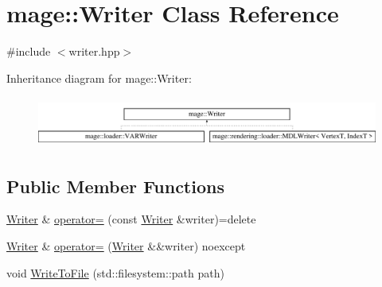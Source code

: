 \hypertarget{classmage_1_1_writer}{}\section{mage\+:\+:Writer Class Reference}
\label{classmage_1_1_writer}


{\ttfamily \#include $<$writer.\+hpp$>$}

Inheritance diagram for mage\+:\+:Writer\+:\begin{figure}[H]
\begin{center}
\leavevmode
\includegraphics[height=1.676647cm]{classmage_1_1_writer}
\end{center}
\end{figure}
\subsection*{Public Member Functions}
\begin{DoxyCompactItemize}
\item 
\mbox{\hyperlink{classmage_1_1_writer}{Writer}} \& \mbox{\hyperlink{classmage_1_1_writer_a81ea888d1b170515713432ca28629ceb}{operator=}} (const \mbox{\hyperlink{classmage_1_1_writer}{Writer}} \&writer)=delete
\item 
\mbox{\hyperlink{classmage_1_1_writer}{Writer}} \& \mbox{\hyperlink{classmage_1_1_writer_a03a93796179f22be90471bea0f7a7cf0}{operator=}} (\mbox{\hyperlink{classmage_1_1_writer}{Writer}} \&\&writer) noexcept
\item 
void \mbox{\hyperlink{classmage_1_1_writer_ac01e930b55888da88e345b0910d4b1c2}{Write\+To\+File}} (std\+::filesystem\+::path path)
\end{DoxyCompactItemize}
